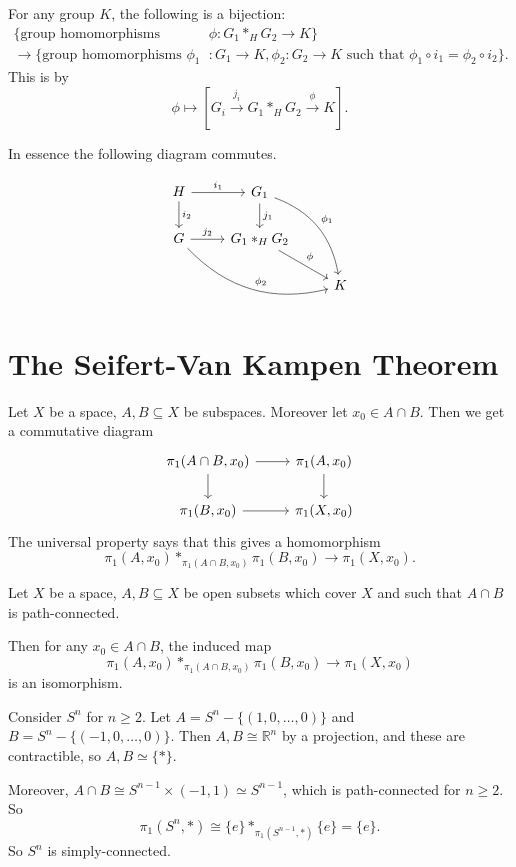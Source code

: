 \documentclass[12pt]{article}
\begin{document}
\begin{lemma}
	For any group $K$, the following is a bijection:
	\begin{align*}
		\{\text{group homomorphisms } &\phi : G_1 \ast_H G_2 \to K\} \\
		\to \{\text{group homomorphisms } \phi_1 &: G_1 \to K, \phi_2 : G_2 \to K \text{ such that } \phi_1 \circ i_1 = \phi_2 \circ i_2\}.
	\end{align*}
	This is by
	\[
		\phi \mapsto [G_i \overset{j_i}{\to} G_1 \ast_H G_2 \overset{\phi}{\to} K].
	\]
\end{lemma}

In essence the following diagram commutes.

\[
\begin{tikzcd}
	H \arrow[r, "i_1"]\arrow[d, "i_2"] & G_1 \arrow[d, "j_1"] \arrow[ddr, bend left, "\phi_1"] &\\
	G \arrow[r, "j_2"] \arrow[drr, bend right, "\phi_2"] & G_1 \ast_H G_2 \arrow[dr, "\phi"] & \\
			   & & K
\end{tikzcd}
\]

\newpage

\section{The Seifert-Van Kampen Theorem}
\label{sec:svk_thm}

Let $X$ be a space, $A, B \subseteq X$ be subspaces. Moreover let $x_0 \in A \cap B$. Then we get a commutative diagram
\[
\begin{tikzcd}
	\pi_1(A \cap B, x_0) \arrow[r] \arrow[d] & \pi_1(A, x_0) \arrow[d] \\
	\pi_1(B, x_0) \arrow[r] & \pi_1(X, x_0)
\end{tikzcd}
\]
The universal property says that this gives a homomorphism
\[
\pi_1(A, x_0) \ast_{\pi_1(A \cap B, x_0)} \pi_1(B, x_0) \to \pi_1(X, x_0).
\]

\begin{theorem}
	Let $X$ be a space, $A, B \subseteq X$ be open subsets which cover $X$ and such that $A \cap B$ is path-connected.

	Then for any $x_0 \in A \cap B$, the induced map
	\[
	\pi_1(A, x_0) \ast_{\pi_1(A \cap B, x_0)} \pi_1(B, x_0) \to \pi_1(X, x_0)
	\]
	is an isomorphism.
\end{theorem}

\begin{exbox}
	Consider $S^n$ for $n \geq 2$. Let $A = S^n - \{(1, 0, \ldots, 0)\}$ and $B = S^n - \{(-1, 0, \ldots, 0)\}$. Then $A, B \cong \mathbb{R}^n$ by a projection, and these are contractible, so $A , B \simeq \{\ast\}$.

	Moreover, $A \cap B \cong S^{n-1} \times (-1, 1) \simeq S^{n-1}$, which is path-connected for $n \geq 2$. So
	\[
		\pi_1(S^n, \ast) \cong \{e\} \ast_{\pi_1(S^{n-1}, \ast)} \{e\} = \{e\}.
	\]
	So $S^n$ is simply-connected.
\end{exbox}
\end{document}
